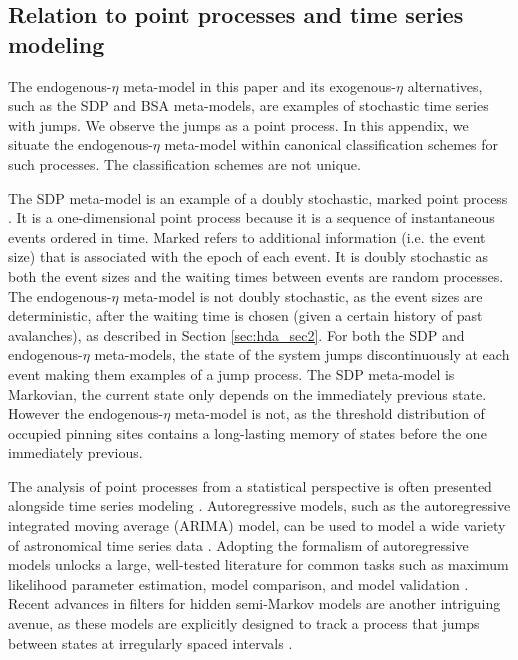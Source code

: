 \begin{subappendices}
\section{Relation to point processes and time series modeling} \label{sec:hda_timeseries}
The endogenous-$\eta$ meta-model in this paper and its exogenous-$\eta$ alternatives, such as the SDP \citep{Fulgenzi2017} and BSA \citep{Carlin2020bsa} meta-models, are examples of stochastic time series with jumps. We observe the jumps as a point process. In this appendix, we situate the endogenous-$\eta$ meta-model within canonical classification schemes for such processes. The classification schemes are not unique.

The SDP meta-model is an example of a doubly stochastic, marked point process \citep{Cox1966, Cinlar1975, Fulgenzi2017}. It is a one-dimensional point process because it is a sequence of instantaneous events ordered in time. Marked refers to additional information (i.e. the event size) that is associated with the epoch of each event. It is doubly stochastic as both the event sizes and the waiting times between events are random processes. The endogenous-$\eta$ meta-model is not doubly stochastic, as the event sizes are deterministic, after the waiting time is chosen (given a certain history of past avalanches), as described in Section \ref{sec:hda_sec2}. For both the SDP and endogenous-$\eta$ meta-models, the state of the system jumps discontinuously at each event making them examples of a jump process. The SDP meta-model is Markovian, the current state only depends on the immediately previous state. However the endogenous-$\eta$ meta-model is not, as the threshold distribution of occupied pinning sites contains a long-lasting memory of states before the one immediately previous.

The analysis of point processes from a statistical perspective is often presented alongside time series modeling \citep{Kingman1993, Box2015}. Autoregressive models, such as the autoregressive integrated moving average (ARIMA) model, can be used to model a wide variety of astronomical time series data \citep{Feigelson2018}. Adopting the formalism of autoregressive models unlocks a large, well-tested literature for common tasks such as maximum likelihood parameter estimation, model comparison, and model validation \citep{Box2015}. Recent advances in filters for hidden semi-Markov models are another intriguing avenue, as these models are explicitly designed to track a process that jumps between states at irregularly spaced intervals \citep{VanDerHoek2018}.


\end{subappendices}
